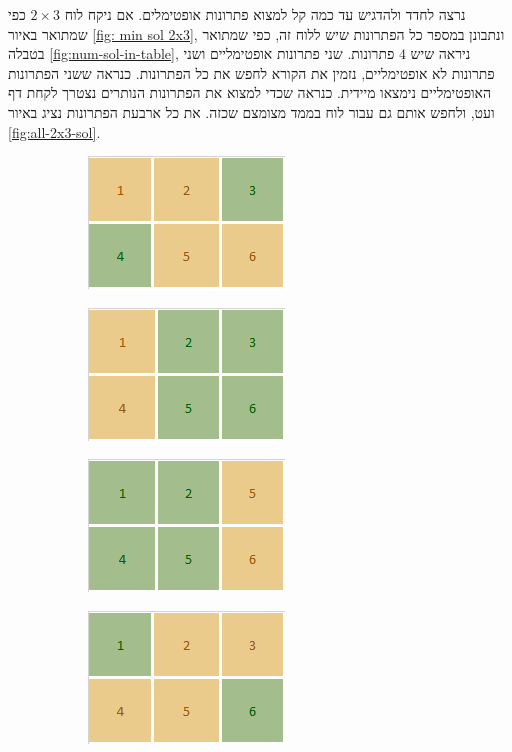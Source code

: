\documentclass[12pt,leqno]{article}
\theoremstyle{theoremdd}
\begin{document}
נרצה לחדד ולהדגיש עד כמה קל למצוא פתרונות אופטימלים.
אם ניקח לוח 
$2 \times 3$
כפי שמתואר 
באיור 
\ref{fig: min sol 2x3},
ונתבונן במספר כל הפתרונות שיש ללוח זה,
כפי
שמתואר בטבלה 
\ref{fig:num-sol-in-table},
ניראה שיש 
$4$
פתרונות.
שני פתרונות אופטימליים 
ושני פתרונות לא אופטימליים,
נזמין את הקורא לחפש את כל הפתרונות.
כנראה ששני הפתרונות האופטימליים נימצאו מיידית.
כנראה שכדי למצוא את הפתרונות הנותרים 
נצטרך לקחת דף ועט, ולחפש אותם גם עבור לוח בממד מצומצם שכזה.
את כל ארבעת הפתרונות נציג באיור 
\ref{fig:all-2x3-sol}.

\begin{figure}[ht]
    \caption{משחק על גרף לדוגמה}
    \label{fig:all-2x3-sol}
    \centering
    \begin{subfigure}{.20\textwidth}
        \centering
        \includegraphics{images/min_sol_2x3.PNG}
    \end{subfigure}%
    \begin{subfigure}{.20\textwidth}
        \centering
        \includegraphics{images/2x3_2.png}
    \end{subfigure}%
    \begin{subfigure}{.20\textwidth}
        \centering
        \includegraphics{images/2x3_3.png}
    \end{subfigure}%
    \begin{subfigure}{.20\textwidth}
        \centering
        \includegraphics{images/2x3_4.png}
    \end{subfigure}%
\end{figure}
\end{document}
